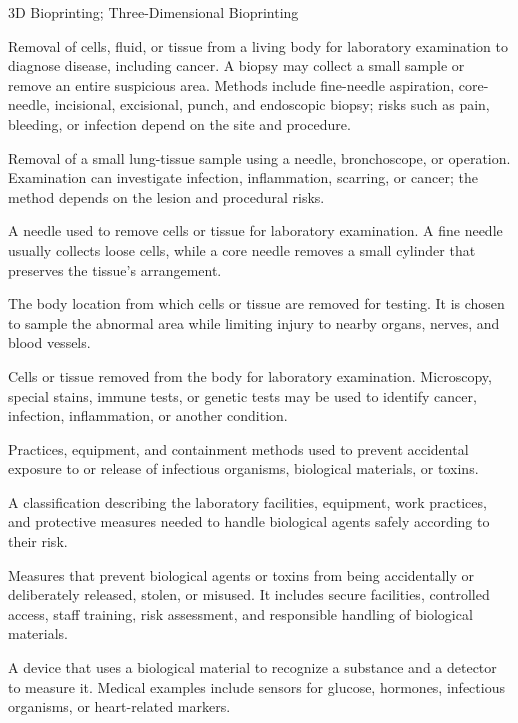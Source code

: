 \synonyms
3D Bioprinting; Three-Dimensional Bioprinting

 Removal of cells, fluid, or tissue from a living body for laboratory examination to diagnose disease, including cancer. A biopsy may collect a small sample or remove an entire suspicious area. Methods include fine-needle aspiration, core-needle, incisional, excisional, punch, and endoscopic biopsy; risks such as pain, bleeding, or infection depend on the site and procedure.

 Removal of a small lung-tissue sample using a needle, bronchoscope, or operation. Examination can investigate infection, inflammation, scarring, or cancer; the method depends on the lesion and procedural risks.

 A needle used to remove cells or tissue for laboratory examination. A fine needle usually collects loose cells, while a core needle removes a small cylinder that preserves the tissue's arrangement.

 The body location from which cells or tissue are removed for testing. It is chosen to sample the abnormal area while limiting injury to nearby organs, nerves, and blood vessels.

 Cells or tissue removed from the body for laboratory examination. Microscopy, special stains, immune tests, or genetic tests may be used to identify cancer, infection, inflammation, or another condition.

 Practices, equipment, and containment methods used to prevent accidental exposure to or release of infectious organisms, biological materials, or toxins.

 A classification describing the laboratory facilities, equipment, work practices, and protective measures needed to handle biological agents safely according to their risk.

 Measures that prevent biological agents or toxins from being accidentally or deliberately released, stolen, or misused. It includes secure facilities, controlled access, staff training, risk assessment, and responsible handling of biological materials.

 A device that uses a biological material to recognize a substance and a detector to measure it. Medical examples include sensors for glucose, hormones, infectious organisms, or heart-related markers.

